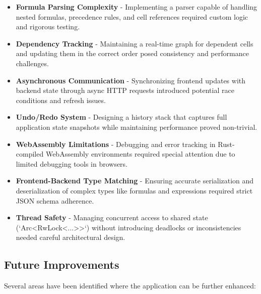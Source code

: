 \begin{itemize}
    \item \textbf{Formula Parsing Complexity} - Implementing a parser capable of handling nested formulas, precedence rules, and cell references required custom logic and rigorous testing.
    
    \item \textbf{Dependency Tracking} - Maintaining a real-time graph for dependent cells and updating them in the correct order posed consistency and performance challenges.
    
    \item \textbf{Asynchronous Communication} - Synchronizing frontend updates with backend state through async HTTP requests introduced potential race conditions and refresh issues.
    
    \item \textbf{Undo/Redo System} - Designing a history stack that captures full application state snapshots while maintaining performance proved non-trivial.
    
    \item \textbf{WebAssembly Limitations} - Debugging and error tracking in Rust-compiled WebAssembly environments required special attention due to limited debugging tools in browsers.
    
    \item \textbf{Frontend-Backend Type Matching} - Ensuring accurate serialization and deserialization of complex types like formulas and expressions required strict JSON schema adherence.
    
    \item \textbf{Thread Safety} - Managing concurrent access to shared state (`Arc<RwLock<...>>`) without introducing deadlocks or inconsistencies needed careful architectural design.
\end{itemize}

\subsection{Future Improvements}

Several areas have been identified where the application can be further enhanced:

